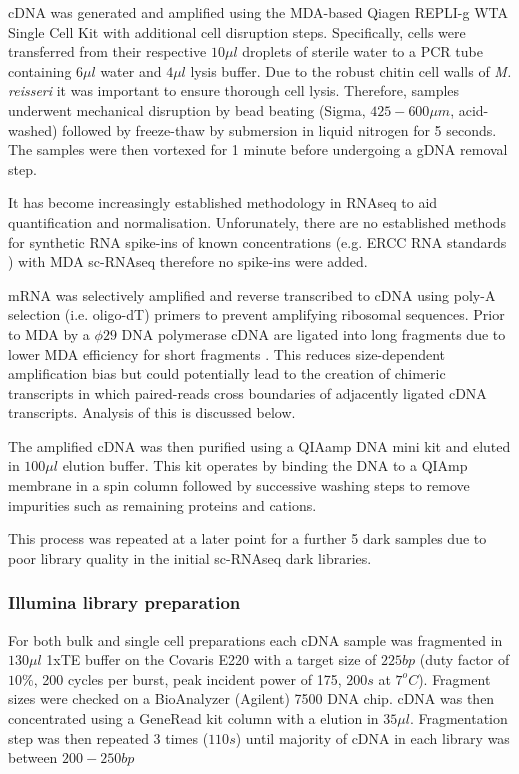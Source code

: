cDNA was generated and amplified using the MDA-based Qiagen REPLI-g WTA Single Cell Kit \citep{Korfhage2015}
with additional cell disruption steps. 
Specifically, cells were transferred from their respective \(10\mu l\) droplets of sterile water to
a PCR tube containing \(6\mu l\) water and \(4\mu l \) lysis buffer. 
Due to the robust chitin cell walls of \textit{M. reisseri} \citep{Kapaun1995} it was important to
ensure thorough cell lysis. Therefore, samples underwent mechanical disruption by bead beating (Sigma, \(425-600\mu m\), acid-washed)
followed by freeze-thaw by submersion in liquid nitrogen for 5 seconds.  The samples were
then vortexed for 1 minute before undergoing a gDNA removal step.

It has become increasingly established methodology in RNAseq to aid quantification
and normalisation. Unforunately, there are no established methods for synthetic RNA spike-ins
of known concentrations (e.g. ERCC RNA standards \citep{Jiang2011}) with MDA
sc-RNAseq therefore no spike-ins were added.

mRNA was selectively amplified and reverse transcribed to cDNA using poly-A selection (i.e. oligo-dT) primers
to prevent amplifying ribosomal sequences. Prior to MDA by a \(\phi29\) DNA polymerase
cDNA are ligated into long fragments due to lower MDA efficiency for short fragments \citep{Korfhage2015}.
This reduces size-dependent amplification bias but could potentially lead to the creation
of chimeric transcripts in which paired-reads cross boundaries of adjacently ligated
cDNA transcripts.  Analysis of this is discussed below.

The amplified cDNA was then purified using a QIAamp DNA mini kit and eluted in \(100\mu l\) elution buffer.
This kit operates by binding the DNA to a QIAmp membrane in a spin column followed by successive washing steps
to remove impurities such as remaining proteins and cations. 


This process was repeated at a later point for a further 5 dark samples due to poor library quality in
the initial sc-RNAseq dark libraries. 

\subsubsection{Illumina library preparation}

For both bulk and single cell preparations each cDNA sample was fragmented in \(130\mu l\) 1xTE buffer on the Covaris E220 
with a target size of \(225bp\) (duty factor of \(10\%\), 200 cycles per burst, peak incident power
of 175, \(200s\) at \(7^{o}C\)). Fragment sizes were checked on a BioAnalyzer (Agilent) 7500 DNA chip.
cDNA was then concentrated using a GeneRead kit column with a elution in \(35\mu l\). Fragmentation
step was then repeated 3 times (\(110s\)) until majority of cDNA in each library was between \(200-250bp\)

